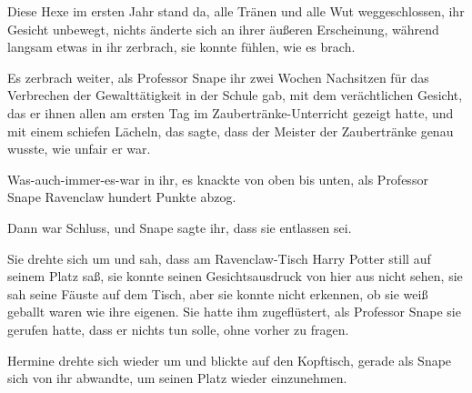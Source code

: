 Diese Hexe im ersten Jahr stand da, alle Tränen und alle Wut weggeschlossen, ihr Gesicht unbewegt, nichts änderte sich an ihrer äußeren Erscheinung, während langsam etwas in ihr zerbrach, sie konnte fühlen, wie es brach.

Es zerbrach weiter, als Professor Snape ihr zwei Wochen Nachsitzen für das Verbrechen der Gewalttätigkeit in der Schule gab, mit dem verächtlichen Gesicht, das er ihnen allen am ersten Tag im Zaubertränke-Unterricht gezeigt hatte, und mit einem schiefen Lächeln, das sagte, dass der Meister der Zaubertränke genau wusste, wie unfair er war.

Was-auch-immer-es-war in ihr, es knackte von oben bis unten, als Professor Snape Ravenclaw hundert Punkte abzog.

Dann war Schluss, und Snape sagte ihr, dass sie entlassen sei.

Sie drehte sich um und sah, dass am Ravenclaw-Tisch Harry Potter still auf seinem Platz saß, sie konnte seinen Gesichtsausdruck von hier aus nicht sehen, sie sah seine Fäuste auf dem Tisch, aber sie konnte nicht erkennen, ob sie weiß geballt waren wie ihre eigenen. Sie hatte ihm zugeflüstert, als Professor Snape sie gerufen hatte, dass er nichts tun solle, ohne vorher zu fragen.

Hermine drehte sich wieder um und blickte auf den Kopftisch, gerade als Snape sich von ihr abwandte, um seinen Platz wieder einzunehmen.

